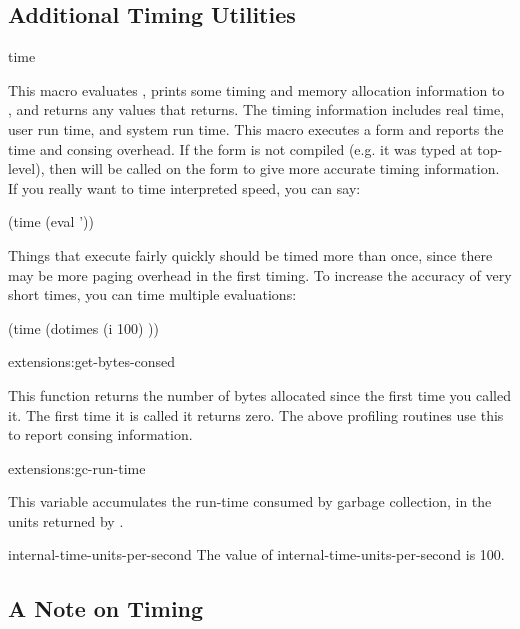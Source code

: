 \subsection{Additional Timing Utilities}

\begin{defmac}{}{time}{ }

  This macro evaluates , prints some timing and memory
  allocation information to , and returns any
  values that  returns.  The timing information includes
  real time, user run time, and system run time.  This macro executes
  a form and reports the time and consing overhead.  If the
   form is not compiled (e.g. it was typed at top-level),
  then  will be called on the form to give more accurate
  timing information.  If you really want to time interpreted speed,
  you can say:
\begin{lisp}
(time (eval '))
\end{lisp}
Things that execute fairly quickly should be timed more than once,
since there may be more paging overhead in the first timing.  To
increase the accuracy of very short times, you can time multiple
evaluations:
\begin{lisp}
(time (dotimes (i 100) ))
\end{lisp}
\end{defmac}

\begin{defun}{extensions:}{get-bytes-consed}{}
  
  This function returns the number of bytes allocated since the first
  time you called it.  The first time it is called it returns zero.
  The above profiling routines use this to report consing information.
\end{defun}

\begin{defvar}{extensions:}{gc-run-time}
  
  This variable accumulates the run-time consumed by garbage
  collection, in the units returned by
  .
\end{defvar}

\begin{defconst}{}{internal-time-units-per-second}
The value of internal-time-units-per-second is 100.
\end{defconst}

\subsection{A Note on Timing}

